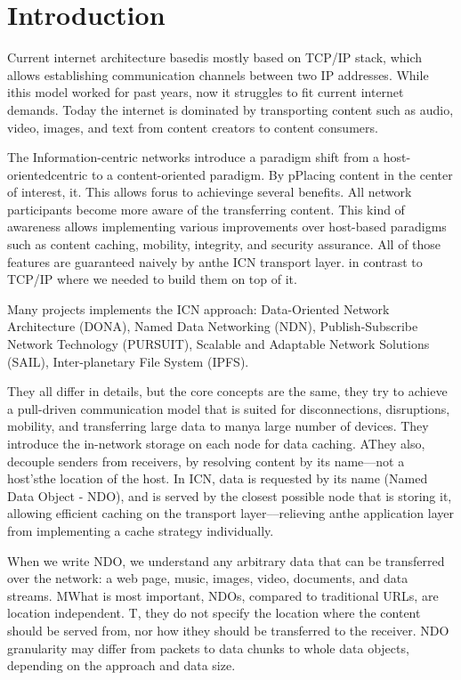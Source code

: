 \chapter{Introduction}
\label{introduction}
Current internet architecture basedis mostly based on TCP/IP stack, which allows establishing communication channels between two IP addresses. While ithis model worked for past years, now it struggles to fit current internet demands. Today the internet is dominated by transporting content such as audio, video, images, and text from content creators to content consumers. 

The Information-centric networks introduce a paradigm shift from a host-orientedcentric to a content-oriented paradigm. By pPlacing content in the center of interest, it. This allows forus to achievinge several benefits. All network participants become more aware of the transferring content. This kind of awareness allows implementing various improvements over host-based paradigms such as content caching, mobility, integrity, and security assurance. All of those features are guaranteed naively by anthe ICN transport layer. in contrast to TCP/IP where we needed to build them on top of it. 

Many projects implements the ICN approach: Data-Oriented Network Architecture (DONA), Named Data Networking (NDN), Publish-Subscribe Network Technology (PURSUIT), Scalable and Adaptable Network Solutions (SAIL), Inter-planetary File System (IPFS).

They all differ in details, but the core concepts are the same, they try to achieve a pull-driven communication model that is suited for disconnections, disruptions, mobility, and transferring large data to manya large number of devices. They introduce the in-network storage on each node for data caching. AThey also, decouple senders from receivers, by resolving content by its name––not a host'sthe location of the host. 
In ICN, data is requested by its name (Named Data Object - NDO), and is served by the closest possible node that is storing it, allowing efficient caching on the transport layer––relieving anthe application layer from implementing a cache strategy individually.

When we write NDO, we understand any arbitrary data that can be transferred over the network: a web page, music, images, video, documents, and data streams. MWhat is most important, NDOs, compared to traditional URLs, are location independent. T, they do not specify the location where the content should be served from, nor how ithey should be transferred to the receiver. NDO granularity may differ from packets to data chunks to whole data objects, depending on the approach and data size.

